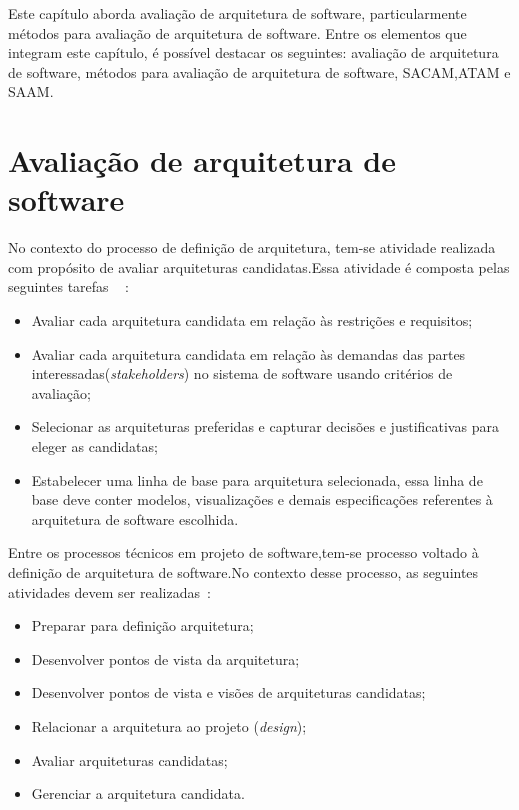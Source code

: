 Este capítulo aborda avaliação de arquitetura de software, particularmente métodos para avaliação de arquitetura de software. Entre os elementos que integram este capítulo, é possível destacar os seguintes: avaliação de arquitetura de software, métodos para avaliação de arquitetura de software, \acrfull{SACAM},\acrfull{ATAM} e \acrfull{SAAM}.

\section{Avaliação de arquitetura de software}

No contexto do processo de definição de arquitetura, tem-se atividade realizada com propósito de avaliar arquiteturas candidatas.Essa atividade é composta pelas seguintes tarefas ~\cite{ISO_12207} :
\begin{itemize}
    \item Avaliar cada arquitetura candidata em relação às restrições e requisitos;
    \item Avaliar cada arquitetura candidata em relação às demandas das partes interessadas(\emph{stakeholders}) no sistema de software usando critérios de avaliação;
    \item Selecionar as arquiteturas preferidas e capturar decisões e justificativas para eleger as candidatas;
    \item Estabelecer uma linha de base para arquitetura selecionada, essa linha de base deve conter modelos, visualizações e demais especificações referentes à arquitetura de software escolhida.
\end{itemize}

Entre os processos técnicos em projeto de software,tem-se processo voltado à definição de arquitetura de software.No contexto desse processo, as seguintes atividades devem ser realizadas~\cite{ISO_12207}:

\begin{itemize}
    \item Preparar para definição arquitetura;
    \item Desenvolver  pontos de vista da arquitetura;
    \item Desenvolver pontos de vista e visões de arquiteturas candidatas;
    \item Relacionar a arquitetura ao projeto (\emph{design});
    \item Avaliar arquiteturas candidatas;
    \item Gerenciar a arquitetura candidata.
\end{itemize}


